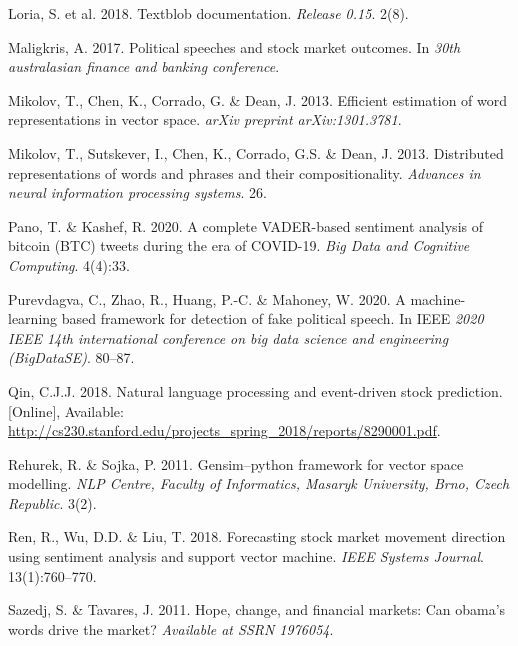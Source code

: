 \documentclass[11pt,preprint, authoryear]{elsarticle}
\numberwithin{equation}{section}
\numberwithin{figure}{section}
\numberwithin{table}{section}
\newlength{\cslhangindent}
\newenvironment{CSLReferences}%
  {\setlength{\parindent}{0pt}%
  \everypar{\setlength{\hangindent}{\cslhangindent}}\ignorespaces}%
  {\par}
\begin{document}
\begin{CSLReferences}{1}{0}
\leavevmode{}%
Loria, S. et al. 2018. Textblob documentation. \emph{Release 0.15}.
2(8).

\leavevmode{}%
Maligkris, A. 2017. Political speeches and stock market outcomes. In
\emph{30th australasian finance and banking conference}.

\leavevmode{}%
Mikolov, T., Chen, K., Corrado, G. \& Dean, J. 2013. Efficient
estimation of word representations in vector space. \emph{arXiv preprint
arXiv:1301.3781}.

\leavevmode{}%
Mikolov, T., Sutskever, I., Chen, K., Corrado, G.S. \& Dean, J. 2013.
Distributed representations of words and phrases and their
compositionality. \emph{Advances in neural information processing
systems}. 26.

\leavevmode{}%
Pano, T. \& Kashef, R. 2020. A complete VADER-based sentiment analysis
of bitcoin (BTC) tweets during the era of COVID-19. \emph{Big Data and
Cognitive Computing}. 4(4):33.

\leavevmode{}%
Purevdagva, C., Zhao, R., Huang, P.-C. \& Mahoney, W. 2020. A
machine-learning based framework for detection of fake political speech.
In IEEE \emph{2020 IEEE 14th international conference on big data
science and engineering (BigDataSE)}. 80--87.

\leavevmode{}%
Qin, C.J.J. 2018. Natural language processing and event-driven stock
prediction. {[}Online{]}, Available:
\url{http://cs230.stanford.edu/projects_spring_2018/reports/8290001.pdf}.

\leavevmode{}%
Rehurek, R. \& Sojka, P. 2011. Gensim--python framework for vector space
modelling. \emph{NLP Centre, Faculty of Informatics, Masaryk University,
Brno, Czech Republic}. 3(2).

\leavevmode{}%
Ren, R., Wu, D.D. \& Liu, T. 2018. Forecasting stock market movement
direction using sentiment analysis and support vector machine.
\emph{IEEE Systems Journal}. 13(1):760--770.

\leavevmode{}%
Sazedj, S. \& Tavares, J. 2011. Hope, change, and financial markets: Can
obama's words drive the market? \emph{Available at SSRN 1976054}.


\end{CSLReferences}
\end{document}
